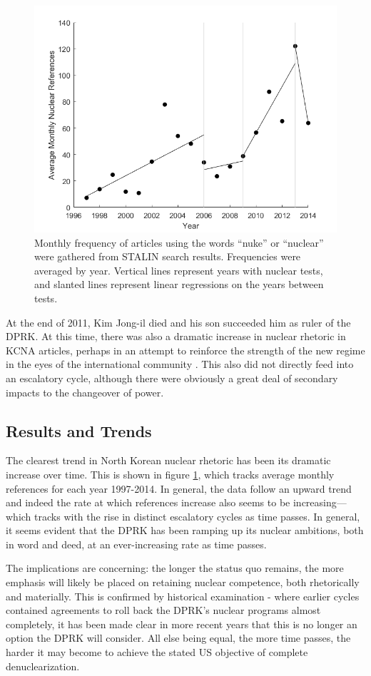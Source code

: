 \begin{figure}
\centering
	\includegraphics[width=0.7\linewidth]{../kcna_refs_updated}
	\caption{Monthly frequency of articles using the words ``nuke'' or ``nuclear'' were gathered from STALIN search results. Frequencies were averaged by year. Vertical lines represent years with nuclear tests, and slanted lines represent linear regressions on the years between tests.}
\label{fig:kcna_refs}
\end{figure}


At the end of 2011, Kim Jong-il died and his son succeeded him as ruler of the DPRK. At this time, there was also a dramatic increase in nuclear rhetoric in KCNA articles, perhaps in an attempt to reinforce the strength of the new regime in the eyes of the international community \cite{rich14}. This also did not directly feed into an escalatory cycle, although there were obviously a great deal of secondary impacts to the changeover of power.

\subsection{Results and Trends}

The clearest trend in North Korean nuclear rhetoric has been its dramatic increase over time. This is shown in figure \ref{fig:kcna_refs}, which tracks average monthly references for each year 1997-2014. In general, the data follow an upward trend and indeed the rate at which references increase also seems to be increasing---which tracks with the rise in distinct escalatory cycles as time passes. In general, it seems evident that the DPRK has been ramping up its nuclear ambitions, both in word and deed, at an ever-increasing rate as time passes.

The implications are concerning: the longer the status quo remains, the more emphasis will likely be placed on retaining nuclear competence, both rhetorically and materially. This is confirmed by historical examination - where earlier cycles contained agreements to roll back the DPRK's nuclear programs almost completely, it has been made clear in more recent years that this is no longer an option the DPRK will consider. All else being equal, the more time passes, the harder it may become to achieve the stated US objective of complete denuclearization.

